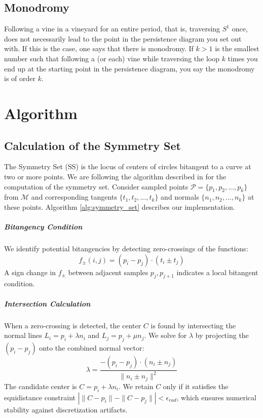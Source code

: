\documentclass[a4paper,english,numberwithinsect]{eurocg26}
\newcommand{\M}{\mathcal{M}}
\begin{document}
\subsection{Monodromy}
Following a vine in a vineyard for an entire period, that is, traversing $S^1$ once, does not necessarily lead to the point in the persistence diagram you set out with. If this is the case, one says that there is monodromy. If $k>1$ is the smallest number such that following a (or each) vine while traversing the loop $k$ times you end up at the starting point in the persistence diagram, you say the monodromy is of order $k$.   




\section{Algorithm}

\subsection{Calculation of the Symmetry Set}

The Symmetry Set (SS) is the locus of centers of circles bitangent to a curve at two or more points. We are following the algorithm described in \cite{Bruce1985symmetry} for the computation of the symmetry set. Consider sampled points $\mathcal{P}=\{p_1,p_2,\dots, p_k\}$ from $\M$ and corresponding tangents $\{t_1,t_2,\dots,t_k\}$ and normals $\{n_1, n_2,\dots, n_k\}$ at these points. Algorithm \ref{alg:symmetry_set} describes our implementation.

\subparagraph{Bitangency Condition} 
We identify potential bitangencies by detecting zero-crossings of the functions:
\begin{equation*}
    f_{\pm}(i, j) = (p_i - p_j) \cdot (t_i \pm t_j)
\end{equation*}
A sign change in $f_{\pm}$ between adjacent samples $p_j, p_{j+1}$ indicates a local bitangent condition.

\subparagraph{Intersection Calculation}
When a zero-crossing is detected, the center $C$ is found by intersecting the normal lines $L_i = p_i + \lambda n_i$ and $L_j = p_j + \mu n_j$. We solve for $\lambda$ by projecting the  $(p_i-p_j)$ onto the combined normal vector:
\begin{equation*}
    \lambda = \frac{-(p_i - p_j) \cdot (n_i \pm n_j)}{\|n_i \pm n_j\|^2}
\end{equation*}
The candidate center is $C = p_i + \lambda n_i$. We retain $C$ only if it satisfies the equidistance constraint $|\|C-p_i\| - \|C-p_j\|| < \epsilon_{rad}$, which ensures numerical stability against discretization artifacts.
\end{document}
